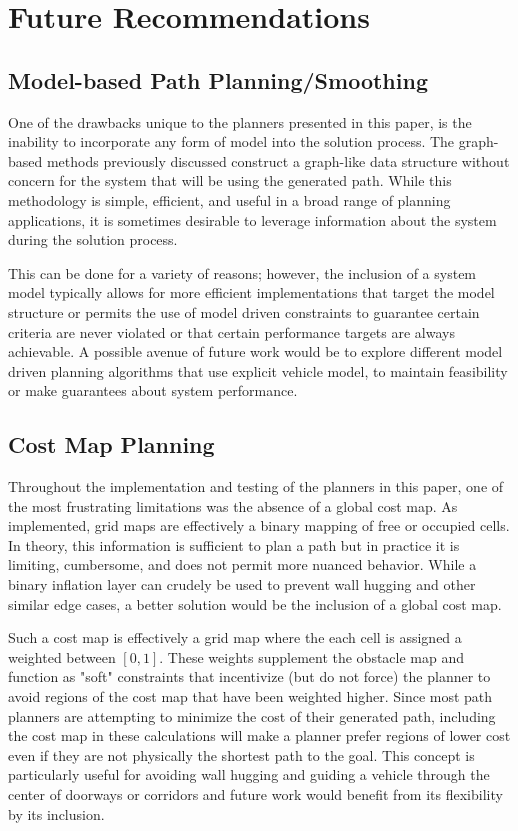 \section{Future Recommendations}

\subsection{Model-based Path Planning/Smoothing}

One of the drawbacks unique to the planners presented in this paper, is the inability to incorporate any form of model into the solution process. The graph-based methods previously discussed construct a graph-like data structure without concern for the system that will be using the generated path. While this methodology is simple, efficient, and useful in a broad range of planning applications, it is sometimes desirable to leverage information about the system during the solution process. 

This can be done for a variety of reasons; however, the inclusion of a system model typically allows for more efficient implementations that target the model structure or permits the use of model driven constraints to guarantee certain criteria are never violated or that certain performance targets are always achievable. A possible avenue of future work would be to explore different model driven planning algorithms that use explicit vehicle model, to maintain feasibility or make guarantees about system performance.

\subsection{Cost Map Planning} 

Throughout the implementation and testing of the planners in this paper, one of the most frustrating limitations was the absence of a global cost map. As implemented, grid maps are effectively a binary mapping of free or occupied cells. In theory, this information is sufficient to plan a path but in practice it is limiting, cumbersome, and does not permit more nuanced behavior. While a binary inflation layer can crudely be used to prevent wall hugging and other similar edge cases, a better solution would be the inclusion of a global cost map. 

Such a cost map is effectively a grid map where the each cell is assigned a weighted between $[0, 1]$. These weights supplement the obstacle map and function as "soft" constraints that incentivize (but do not force) the planner to avoid regions of the cost map that have been weighted higher. Since most path planners are attempting to minimize the cost of their generated path, including the cost map in these calculations will make a planner prefer regions of lower cost even if they are not physically the shortest path to the goal. This concept is particularly useful for avoiding wall hugging and guiding a vehicle through the center of doorways or corridors and future work would benefit from its flexibility by its inclusion. 

